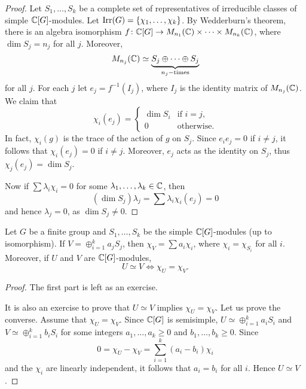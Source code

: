 \begin{proof}
    Let $S_1,\dots,S_k$ be a complete set of representatives of 
    irreducible classes of 
    simple $\mathbb{C}[G]$-modules. Let 
    $\operatorname{Irr}(G)=\{\chi_1,\dots,\chi_k\}$. 
    By Wedderburn's theorem, there is 
    an algebra isomorphism 
    $f\colon \mathbb{C}[G]\to M_{n_1}(\mathbb{C})\times\cdots\times M_{n_k}(\mathbb{C})$, 
    where $\dim S_j=n_j$ for all $j$. Moreover, 
    \[
    M_{n_j}(\mathbb{C})\simeq \underbrace{S_j\oplus\cdots\oplus S_j}_{n_j-\text{times}}
    \]
    for all $j$. For each $j$ let $e_j=f^{-1}(I_j)$, where
    $I_j$ is the identity matrix of $M_{n_j}(\mathbb{C})$. We claim that 
    \[
        \chi_i(e_j)=\begin{cases}
            \dim S_i & \text{if $i=j$,}\\
            0 & \text{otherwise}.
            \end{cases}
    \]
    In fact, $\chi_i(g)$ is the trace of the action of $g$ on $S_j$. Since 
    $e_ie_j=0$ if $i\ne j$, it follows that 
    $\chi_i(e_j)=0$ if $i\ne j$. Moreover, $e_j$ acts as the identity on $S_j$, thus
    $\chi_j(e_j)=\dim S_j$. 
    
    Now if $\sum\lambda_i\chi_i=0$ for some $\lambda_1,\dots,\lambda_k\in\mathbb{C}$, then
    \[
    (\dim S_j)\lambda_j=\sum\lambda_i\chi_i(e_j)=0
    \]
    and hence $\lambda_j=0$, as $\dim S_j\ne 0$. 
\end{proof}

\begin{theorem}
    Let $G$ be a finite group and $S_1,\dots,S_k$ be the simple
    $\mathbb{C}[G]$-modules (up to isomorphism). If $V=\oplus_{i=1}^k a_jS_j$, then
    $\chi_V=\sum a_i\chi_i$, where 
    $\chi_i=\chi_{S_i}$ for all $i$. Moreover, if $U$ and $V$ 
    are $\mathbb{C}[G]$-modules, 
    \[
    U\simeq V\Longleftrightarrow \chi_U=\chi_V.
    \]
\end{theorem}

\begin{proof}
    The first part is left as an exercise. 
    
    It is also an exercise to prove that $U\simeq V$ implies $\chi_U=\chi_V$. Let us prove
    the converse. Assume that $\chi_U=\chi_V$. Since $\mathbb{C}[G]$ is semisimple, 
    $U\simeq\oplus_{i=1}^k a_iS_i$ and 
    $V\simeq\oplus_{i=1}^k b_iS_i$ for some integers 
    $a_1,\dots,a_k\geq0$ and $b_1,\dots,b_k\geq0$. Since 
    \[
    0=\chi_U-\chi_V=\sum_{i=1}^k (a_i-b_i)\chi_i
    \]
    and the $\chi_i$ are linearly independent, it follows that
    $a_i=b_i$ for all $i$. Hence $U\simeq V$. 
\end{proof}

